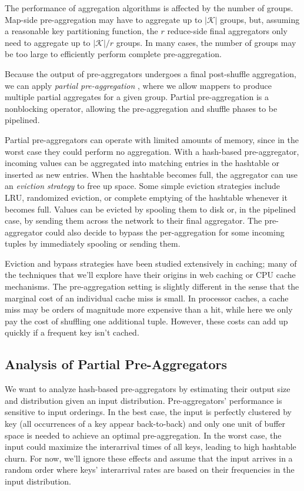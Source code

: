 \documentclass[twocolumn, 10pt]{article}
\newcommand{\keyspace}{\mathcal{K}}
\begin{document}
The performance of aggregation algorithms is affected by the number of groups.
Map-side pre-aggregation may have to aggregate up to $|\keyspace|$ groups,
but, assuming a reasonable key partitioning function, the $r$ reduce-side final
aggregators only need to aggregate up to $|\keyspace|/r$ groups.  In many cases,
the number of groups may be too large to efficiently perform complete
pre-aggregation.

Because the output of pre-aggregators undergoes a final post-shuffle
aggregation, we can apply \emph{partial pre-aggregation}
\cite{partial-preaggregation}, where we allow mappers to produce multiple
partial aggregates for a given group.  Partial pre-aggregation
is a nonblocking operator, allowing the pre-aggregation and shuffle phases
to be pipelined.

Partial pre-aggregators can operate with limited amounts of memory, since in the
worst case they could perform no aggregation.  With a hash-based
pre-aggregator, incoming values can be aggregated into matching entries in the
hashtable or inserted as new entries.  When the hashtable becomes full, the
aggregator can use an \emph{eviction strategy} to free up space.
Some simple eviction strategies include LRU, randomized eviction, or complete
emptying of the hashtable whenever it becomes full.
Values can be evicted by spooling them to disk or, in the pipelined case, by
sending them across the network to their final aggregator.
The pre-aggregator could also decide to bypass the per-aggregation for some
incoming tuples by immediately spooling or sending them.

Eviction and bypass strategies have been studied extensively in caching; many
of the techniques that we'll explore have their origins in web caching or CPU
cache mechanisms.  The pre-aggregation setting is slightly different
in the sense that the marginal cost of an individual cache miss is small.  In
processor caches, a cache miss may be orders of magnitude more expensive than
a hit, while here we only pay the cost of shuffling one additional tuple.
However, these costs can add up quickly if a frequent key isn't cached.

\subsection{Analysis of Partial Pre-Aggregators}

We want to analyze hash-based pre-aggregators by estimating their output size
and distribution given an input distribution.  Pre-aggregators' performance is
sensitive to input orderings.  In the best case, the input is perfectly
clustered by key (all occurrences of a key appear back-to-back) and only one
unit of buffer space is needed to achieve an optimal pre-aggregation.  In the
worst case, the input could maximize the interarrival times of all keys,
leading to high hashtable churn.  For now, we'll ignore these effects and
assume that the input arrives in a random order where keys' interarrival rates
are based on their frequencies in the input distribution.
\end{document}
